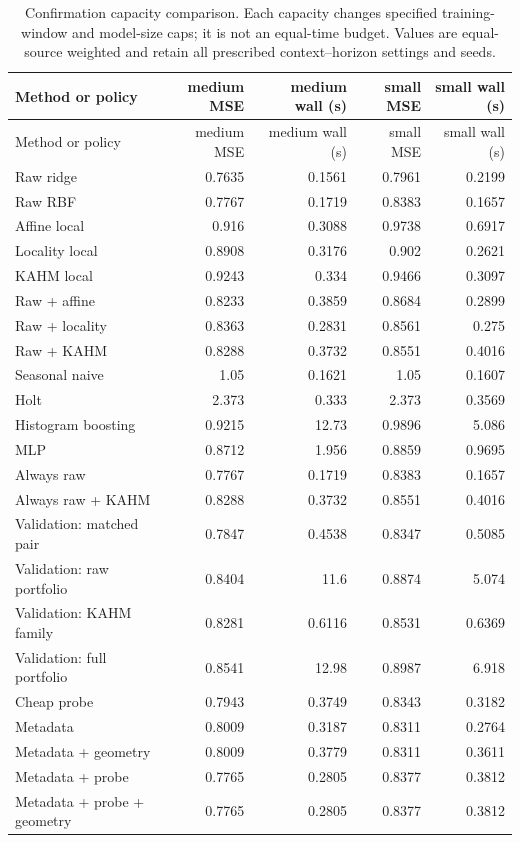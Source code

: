 {\small\setlength{\tabcolsep}{4pt}
\begin{longtable}{lrrrr}
\caption{Confirmation capacity comparison. Each capacity changes specified training-window and model-size caps; it is not an equal-time budget. Values are equal-source weighted and retain all prescribed context--horizon settings and seeds.}\label{tab:capacity-confirmation}\\
\toprule
Method or policy & medium MSE & medium wall (s) & small MSE & small wall (s) \\
\midrule
\endfirsthead
\toprule
Method or policy & medium MSE & medium wall (s) & small MSE & small wall (s) \\
\midrule
\endhead
Raw ridge & 0.7635 & 0.1561 & 0.7961 & 0.2199 \\
Raw RBF & 0.7767 & 0.1719 & 0.8383 & 0.1657 \\
Affine local & 0.916 & 0.3088 & 0.9738 & 0.6917 \\
Locality local & 0.8908 & 0.3176 & 0.902 & 0.2621 \\
KAHM local & 0.9243 & 0.334 & 0.9466 & 0.3097 \\
Raw + affine & 0.8233 & 0.3859 & 0.8684 & 0.2899 \\
Raw + locality & 0.8363 & 0.2831 & 0.8561 & 0.275 \\
Raw + KAHM & 0.8288 & 0.3732 & 0.8551 & 0.4016 \\
Seasonal naive & 1.05 & 0.1621 & 1.05 & 0.1607 \\
Holt & 2.373 & 0.333 & 2.373 & 0.3569 \\
Histogram boosting & 0.9215 & 12.73 & 0.9896 & 5.086 \\
MLP & 0.8712 & 1.956 & 0.8859 & 0.9695 \\
Always raw & 0.7767 & 0.1719 & 0.8383 & 0.1657 \\
Always raw + KAHM & 0.8288 & 0.3732 & 0.8551 & 0.4016 \\
Validation: matched pair & 0.7847 & 0.4538 & 0.8347 & 0.5085 \\
Validation: raw portfolio & 0.8404 & 11.6 & 0.8874 & 5.074 \\
Validation: KAHM family & 0.8281 & 0.6116 & 0.8531 & 0.6369 \\
Validation: full portfolio & 0.8541 & 12.98 & 0.8987 & 6.918 \\
Cheap probe & 0.7943 & 0.3749 & 0.8343 & 0.3182 \\
Metadata & 0.8009 & 0.3187 & 0.8311 & 0.2764 \\
Metadata + geometry & 0.8009 & 0.3779 & 0.8311 & 0.3611 \\
Metadata + probe & 0.7765 & 0.2805 & 0.8377 & 0.3812 \\
Metadata + probe + geometry & 0.7765 & 0.2805 & 0.8377 & 0.3812 \\
\bottomrule
\end{longtable}
}
